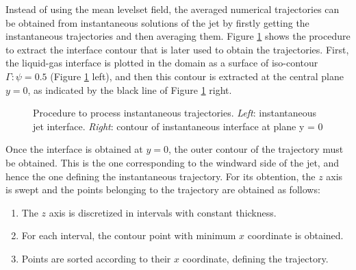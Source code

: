 Instead of using the mean levelset field, the averaged numerical trajectories can be obtained from instantaneous solutions of the jet by firstly getting the instantaneous trajectories and then averaging them. Figure \ref{fig:trajectory_obtention_instantaneous_general} shows the procedure to extract the interface contour that is later used to obtain the trajectories. First, the liquid-gas interface is plotted in the domain as a surface of iso-contour $\Gamma: \psi = 0.5$ (Figure \ref{fig:trajectory_obtention_instantaneous_general} left), and then this contour is extracted at the central plane $y = 0$, as indicated by the black line of Figure \ref{fig:trajectory_obtention_instantaneous_general} right. 

\begin{figure}[h]
     \centering
     \begin{subfigure}[b]{0.45\textwidth}
         \centering
     \end{subfigure}
     \begin{subfigure}[b]{0.45\textwidth}
         \centering
     \end{subfigure}
        \caption[Procedure to obtain instantaneous trajectories.]{Procedure to process instantaneous trajectories. \textsl{Left}: instantaneous jet interface. \textsl{Right}: contour of instantaneous interface at plane y = 0}
        \label{fig:trajectory_obtention_instantaneous_general}
\end{figure}

Once the interface is obtained at $y = 0$, the outer contour of the trajectory must be obtained. This is the one corresponding to the windward side of the jet, and hence the one defining the instantaneous trajectory. For its obtention, the $z$ axis is swept and the points belonging to the trajectory are obtained as follows:

\begin{enumerate}

	\item The $z$ axis is discretized in intervals with constant thickness.
	
	\item For each interval, the contour point with minimum $x$ coordinate is obtained.
	
	\item Points are sorted according to their $x$ coordinate, defining the trajectory.

\end{enumerate}

